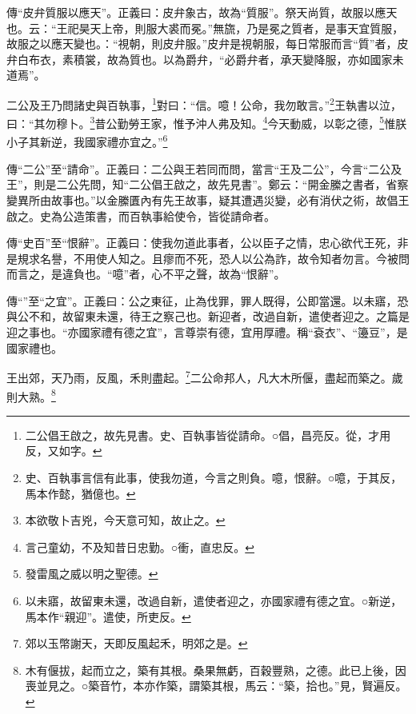 {\noindent\zhuan{}\fzbyks 傳“皮弁質服以應天”。正義曰：皮弁象古，故為“質服”。祭天尚質，故服以應天也。云：“王祀昊天上帝，則服大裘而冕。”無旒，乃是冕之質者，是事天宜質服，故服之以應天變也。：“視朝，則皮弁服。”皮弁是視朝服，每日常服而言“質”者，皮弁白布衣，素積裳，故為質也。以為爵弁，“必爵弁者，承天變降服，亦如國家未道焉”。 \par}

二公及王乃問諸史與百執事，\footnote{二公倡王啟之，故先見書。史、百執事皆從請命。○倡，昌亮反。從，才用反，又如字。}對曰：“信。噫！公命，我勿敢言。”\footnote{史、百執事言信有此事，使我勿道，今言之則負。噫，恨辭。○噫，于其反，馬本作懿，猶億也。}王執書以泣，曰：“其勿穆卜。\footnote{本欲敬卜吉兇，今天意可知，故止之。}昔公勤勞王家，惟予沖人弗及知。\footnote{言己童幼，不及知昔日忠勤。○衝，直忠反。}今天動威，以彰之德，\footnote{發雷風之威以明之聖德。}惟朕小子其新逆，我國家禮亦宜之。”\footnote{以未寤，故留東未還，改過自新，遣使者迎之，亦國家禮有德之宜。○新逆，馬本作“親迎”。遣使，所吏反。}

{\noindent\zhuan{}\fzbyks 傳“二公”至“請命”。正義曰：二公與王若同而問，當言“王及二公”，今言“二公及王”，則是二公先問，知“二公倡王啟之，故先見書”。鄭云：“開金縢之書者，省察變異所由故事也。”以金縢匱內有先王故事，疑其遭遇災變，必有消伏之術，故倡王啟之。史為公造策書，而百執事給使令，皆從請命者。 \par}

{\noindent\zhuan{}\fzbyks 傳“史百”至“恨辭”。正義曰：使我勿道此事者，公以臣子之情，忠心欲代王死，非是規求名譽，不用使人知之。且瘳而不死，恐人以公為詐，故令知者勿言。今被問而言之，是違負也。“噫”者，心不平之聲，故為“恨辭”。 \par}

{\noindent\zhuan{}\fzbyks 傳“”至“之宜”。正義曰：公之東征，止為伐罪，罪人既得，公即當還。以未寤，恐與公不和，故留東未還，待王之察己也。新迎者，改過自新，遣使者迎之。之篇是迎之事也。“亦國家禮有德之宜”，言尊崇有德，宜用厚禮。稱“袞衣”、“籩豆”，是國家禮也。 \par}

王出郊，天乃雨，反風，禾則盡起。\footnote{郊以玉幣謝天，天即反風起禾，明郊之是。}二公命邦人，凡大木所偃，盡起而築之。歲則大熟。\footnote{木有偃拔，起而立之，築有其根。桑果無虧，百穀豐熟，之德。此已上後，因喪並見之。○築音竹，本亦作築，謂築其根，馬云：“築，拾也。”見，賢遍反。}

